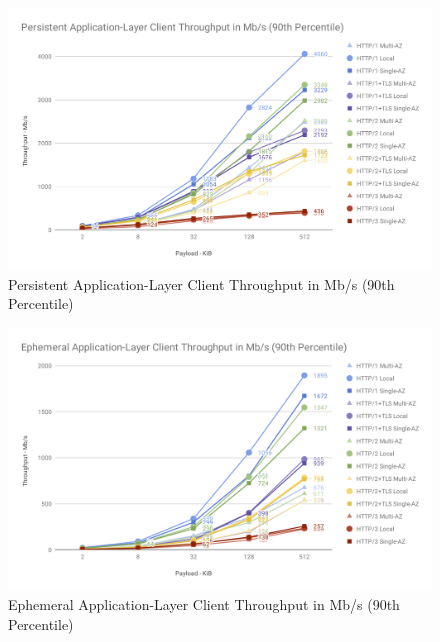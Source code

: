 \begin{figure}[h!]
    \centering
    \includegraphics[width=\linewidth]{figures/charts/Persistent Application-Layer Client Throughput in Mb_s (90th Percentile).png}
    \caption{Persistent Application-Layer Client Throughput in Mb/s (90th Percentile)}
    \label{fig:persistent_app_throughput}
\end{figure}

\begin{figure}[h!]
    \centering
    \includegraphics[width=\linewidth]{figures/charts/Ephemeral Application-Layer Client Throughput in Mb_s (90th Percentile).png}
    \caption{Ephemeral Application-Layer Client Throughput in Mb/s (90th Percentile)}
    \label{fig:ephemeral_app_throughput}
\end{figure}

